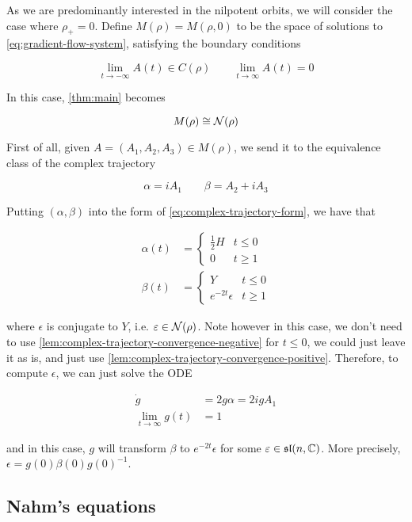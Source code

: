 \documentclass{report}
\renewcommand{\sl}{\mathfrak{sl}}
\begin{document}
As we are predominantly interested in the nilpotent orbits, we will consider the case where \(\rho_+ = 0\). Define \(M(\rho) = M(\rho, 0)\) to be the space of solutions to \cref{eq:gradient-flow-system}, satisfying the boundary conditions

\[\lim_{t \to -\infty}A(t) \in C(\rho) \qquad \lim_{t \to \infty}A(t) = 0\]

In this case, \cref{thm:main} becomes

\[M(\rho) \cong \mathcal{N}(\rho)\]

First of all, given \(A = (A_1, A_2, A_3) \in M(\rho)\), we send it to the equivalence class of the complex trajectory

\[\alpha = iA_1 \qquad \beta = A_2 + iA_3\]

Putting \((\alpha, \beta)\) into the form of \cref{eq:complex-trajectory-form}, we have that

\begin{equation}
    \begin{split}
        \alpha(t) &= \begin{cases}
            \frac12H & t \le 0 \\
            0 & t \ge 1
        \end{cases} \\
        \beta(t) &= \begin{cases}
            Y & t \le 0 \\
            e^{-2t}\epsilon & t \ge 1
        \end{cases}
    \end{split}
\end{equation}

where \(\epsilon\) is conjugate to \(Y\), i.e. \(\varepsilon \in \mathcal{N}(\rho)\). Note however in this case, we don't need to use \cref{lem:complex-trajectory-convergence-negative} for \(t \le 0\), we could just leave it as is, and just use \cref{lem:complex-trajectory-convergence-positive}. Therefore, to compute \(\epsilon\), we can just solve the ODE

\begin{align*}
    \dot g &= 2g\alpha = 2igA_1 \\
    \lim_{t \to \infty}g(t) &= 1
\end{align*}

and in this case, \(g\) will transform \(\beta\) to \(e^{-2t}\epsilon\) for some \(\epsilon \in \sl(n, \C)\). More precisely, \(\epsilon = g(0)\beta(0)g(0)^{-1}\).

\subsection{Nahm's equations}
\end{document}
